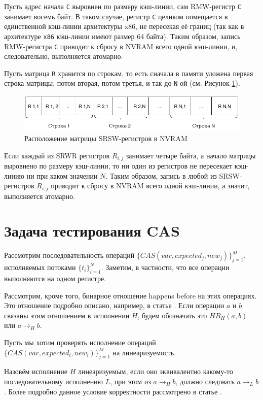 \documentclass[times,specification,annotation]{itmo-student-thesis}
\begin{document}
Пусть адрес начала \texttt{C} выровнен по размеру кэш-линии, сам RMW-регистр \texttt{C} занимает восемь байт. В таком случае, регистр \texttt{C} целиком помещается в единственной кэш-линии архитектуры x86, не пересекая её границ (так как в архитектуре \texttt{x86} кэш-линии имеют размер 64 байта). Таким образом, запись RMW-регистра \texttt{C} приводит к сбросу в NVRAM всего одной кэш-линии, и, следовательно, выполняется атомарно.

Пусть матрица \texttt{R} хранится по строкам, то есть сначала в памяти уложена первая строка матрицы, потом вторая, потом третья, и так до \texttt{N}-ой (см. Рисунок \ref{r-matrix-pic}).

\begin{figure}[H]
  \centering
  \caption{Расположение матрицы SRSW-регистров в NVRAM}
  \label{r-matrix-pic}
  \includegraphics[width=\linewidth]{matrix.png}
\end{figure}

Если каждый из SRWR регистров $R_{i, j}$ занимает четыре байта, а начало матрицы выровнено по размеру кэш-линии, то ни один из регистров не пересекает кэш-линию ни при каком значении $N$. Таким образом, запись в любой из SRSW-регистров $R_{i, j}$ приводит к сбросу в NVRAM всего одной кэш-линии, а значит, выполняется атомарно.

\section{Задача тестирования CAS}

Рассмотрим последовательность операций $\{CAS(var, expected_j, new_j)\}_{j = 1}^M$, исполняемых потоками $\{t_i\}_{i = 1}^N$.  Заметим, в частности, что все операции выполняются на одном регистре.

Рассмотрим, кроме того, бинарное отношение happens before на этих операциях. Это отношение подробно описано, например, в статье \cite{lamport2019time}. Если операции $a$ и $b$ связаны этим отношением в исполнении $H$, будем обозначать это $HB_H(a, b)$ или $a \rightarrow_H b$.

Пусть мы хотим проверять исполнение операций $\{CAS(var, expected_i, new_i)\}_{j = 1}^M$ на линеаризуемость.

Назовём исполнение $H$ линеаризуемым, если оно эквивалентно какому-то последовательному исполнению $L$, при этом из $a \rightarrow_H b$, должно следовать $a \rightarrow_L b$. Более подробно данное условие корректности рассмотрено в статье \cite{herlihy1990linearizability}.
\end{document}
